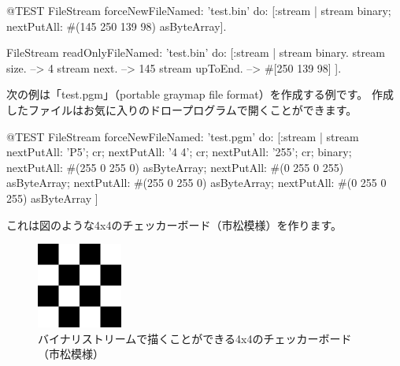 \documentclass[a4paper,10pt,twoside]{book}
\begin{document}
{\begin{code}{@TEST}
FileStream
  forceNewFileNamed: 'test.bin'
  do: [:stream |
          stream
            binary;
            nextPutAll: #(145 250 139 98) asByteArray].

FileStream
  readOnlyFileNamed: 'test.bin'
  do: [:stream |
          stream binary.
          stream size.         --> 4
          stream next.         --> 145
          stream upToEnd. --> #[250 139 98]
      ].
\end{code}

次の例は「test.pgm」（portable graymap file format）を作成する例です。
作成したファイルはお気に入りのドロープログラムで開くことができます。


\begin{code}{@TEST}
FileStream
  forceNewFileNamed: 'test.pgm' 
  do: [:stream |
	stream
		nextPutAll: 'P5'; cr;
		nextPutAll: '4 4'; cr;
		nextPutAll: '255'; cr;
		binary;
		nextPutAll: #(255 0 255 0) asByteArray;
		nextPutAll: #(0 255 0 255) asByteArray;
		nextPutAll: #(255 0 255 0) asByteArray;
		nextPutAll: #(0 255 0 255) asByteArray
	]
\end{code}

これは図のような4x4のチェッカーボード（市松模様）を作ります。

\begin{figure}[!ht]
\centerline{\includegraphics[width=0.25\textwidth]{checkerboard4x4}}
\caption{バイナリストリームで描くことができる4x4のチェッカーボード（市松模様）}
\vspace{.2in}
\end{figure}

}
\end{document}
